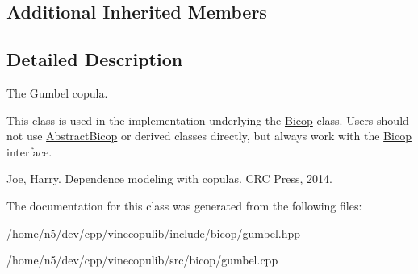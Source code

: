 \subsection*{Additional Inherited Members}


\subsection{Detailed Description}
The Gumbel copula. 

This class is used in the implementation underlying the \hyperlink{classvinecopulib_1_1_bicop}{Bicop} class. Users should not use \hyperlink{classvinecopulib_1_1_abstract_bicop}{Abstract\+Bicop} or derived classes directly, but always work with the \hyperlink{classvinecopulib_1_1_bicop}{Bicop} interface.

Joe, Harry. Dependence modeling with copulas. C\+RC Press, 2014. 

The documentation for this class was generated from the following files\+:\begin{DoxyCompactItemize}
\item 
/home/n5/dev/cpp/vinecopulib/include/bicop/gumbel.\+hpp\item 
/home/n5/dev/cpp/vinecopulib/src/bicop/gumbel.\+cpp\end{DoxyCompactItemize}
